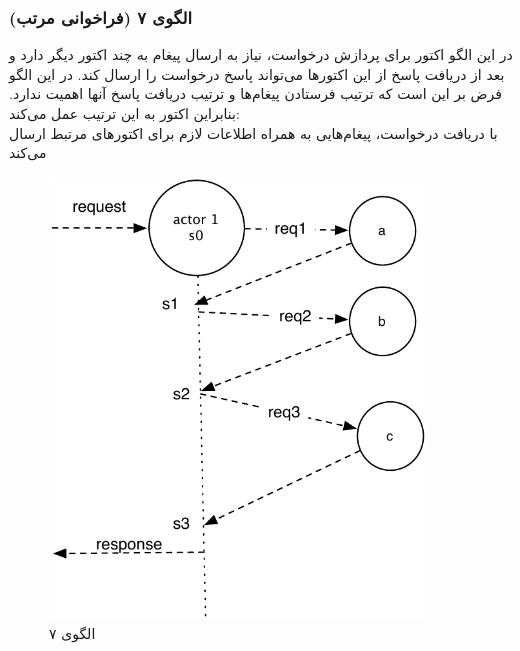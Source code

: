 \subsubsection{الگوی ۷ (فراخوانی مرتب)}
در این الگو اکتور برای پردازش درخواست، نیاز به ارسال پیغام به چند اکتور دیگر دارد و بعد از دریافت پاسخ از این اکتورها می‌تواند پاسخ درخواست را ارسال کند. در این الگو فرض بر این است که ترتیب فرستادن پیغام‌ها و ترتیب دریافت پاسخ‌ آنها اهمیت ندارد. بنابراین اکتور به این ترتیب عمل می‌کند:\\
با دریافت درخواست، پیغام‌هایی به همراه اطلاعات لازم برای اکتورهای مرتبط ارسال می‌کند
\begin{figure}[hb]
    \begin{center}
	\includegraphics[width=10cm]{4-ProposedFramework/Figures/Patterns_statelfull_rpc.pdf}
    \end{center}
    \caption{\label{fig:Patterns_statefull_7}الگوی ۷}
\end{figure}




